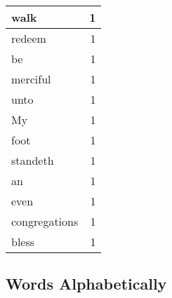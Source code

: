 \begin{center}
\begin{longtable}{l|r}
walk & 1 \\ \hline
redeem & 1 \\ \hline
be & 1 \\ \hline
merciful & 1 \\ \hline
unto & 1 \\ \hline
My & 1 \\ \hline
foot & 1 \\ \hline
standeth & 1 \\ \hline
an & 1 \\ \hline
even & 1 \\ \hline
congregations & 1 \\ \hline
bless & 1 \\ \hline
\end{longtable}
\end{center}



\normalsize



\subsection{Words Alphabetically}

